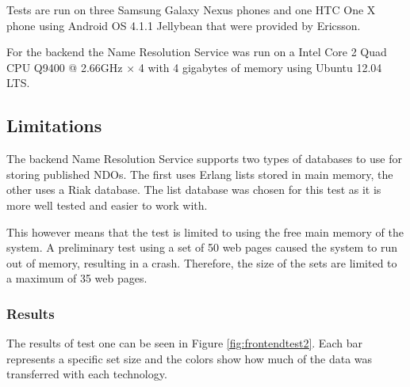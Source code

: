 Tests are run on three Samsung Galaxy Nexus phones and one HTC One X phone using Android OS 4.1.1 Jellybean that were provided by Ericsson.

For the backend the Name Resolution Service was run on a Intel Core 2 Quad CPU Q9400 @ 2.66GHz × 4 with 4 gigabytes of memory using Ubuntu 12.04 LTS.

\subsection{Limitations}

The backend Name Resolution Service supports two types of databases to use for storing published NDOs. The first uses Erlang lists stored in main memory, the other uses a Riak database. The list database was chosen for this test as it is more well tested and easier to work with.

This however means that the test is limited to using the free main memory of the system. A preliminary test using a set of 50 web pages caused the system to run out of memory, resulting in a crash. Therefore, the size of the sets are limited to a maximum of 35 web pages.

\subsubsection{Results}




The results of test one can be seen in Figure \ref{fig:frontendtest2}. Each bar represents a specific set size and the colors show how much of the data was transferred with each technology.

